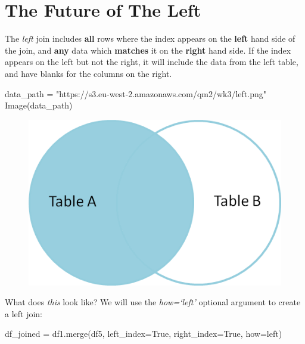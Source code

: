 \documentclass[
  letterpaper,
  DIV=11,
  numbers=noendperiod]{scrreprt}
\newenvironment{Shaded}{\begin{snugshade}}{\end{snugshade}}
\newcommand{\NormalTok}[1]{\textcolor[rgb]{0.00,0.23,0.31}{#1}}
\newcommand{\OperatorTok}[1]{\textcolor[rgb]{0.37,0.37,0.37}{#1}}
\newcommand{\StringTok}[1]{\textcolor[rgb]{0.13,0.47,0.30}{#1}}
\newcommand{\VariableTok}[1]{\textcolor[rgb]{0.07,0.07,0.07}{#1}}
\begin{document}
\hypertarget{the-future-of-the-left}{%
\section{The Future of The Left}\label{the-future-of-the-left}}

The \emph{left} join includes \textbf{all} rows where the index appears
on the \textbf{left} hand side of the join, and \textbf{any} data which
\textbf{matches} it on the \textbf{right} hand side. If the index
appears on the left but not the right, it will include the data from the
left table, and have blanks for the columns on the right.

\begin{Shaded}
\begin{Highlighting}[]
\NormalTok{data\_path }\OperatorTok{=} \StringTok{"https://s3.eu{-}west{-}2.amazonaws.com/qm2/wk3/left.png"}
\NormalTok{Image(data\_path)}
\end{Highlighting}
\end{Shaded}

\begin{figure}[H]

{\centering \includegraphics{notebooks/W06. Merging and Joining_files/figure-pdf/cell-38-output-1.png}

}

\end{figure}

What does \emph{this} look like? We will use the \emph{how=`left'}
optional argument to create a left join:

\begin{Shaded}
\begin{Highlighting}[]
\NormalTok{df\_joined }\OperatorTok{=}\NormalTok{ df1.merge(df5, left\_index}\OperatorTok{=}\VariableTok{True}\NormalTok{, right\_index}\OperatorTok{=}\VariableTok{True}\NormalTok{, how}\OperatorTok{=}\StringTok{\textquotesingle{}left\textquotesingle{}}\NormalTok{)}
\end{Highlighting}
\end{Shaded}
\end{document}
